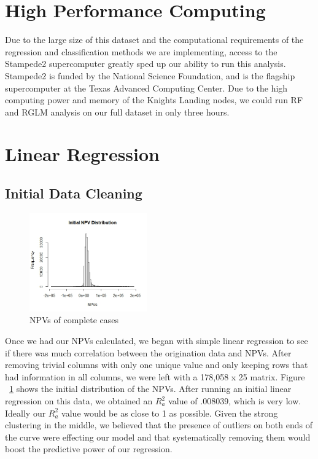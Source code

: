 \documentclass[12 pt]{uncw_thesis}
\theoremstyle{plain}
\theoremstyle{remark}
\theoremstyle{definition}
\begin{document}
\section{High Performance Computing}
Due to the large size of this dataset and the computational requirements of the regression and classification methods we are implementing, access to the Stampede2 supercomputer greatly sped up our ability to run this analysis. Stampede2 is funded by the National Science Foundation, and is the flagship supercomputer at the Texas Advanced Computing Center. Due to the high computing power and memory of the Knights Landing nodes, we could run RF and RGLM analysis on our full dataset in only three hours.  
\section{Linear Regression}
\subsection{Initial Data Cleaning}
\begin{figure}
	\vspace{-2cm}
	\centering
	\includegraphics[width=0.45\textwidth]{images/InitalNPVs.jpeg}
	\caption{NPVs of complete cases}
	\label{fig:InitialNPVs}
\end{figure}
Once we had our NPVs calculated, we began with simple linear regression to see if there was much correlation between the origination data and NPVs. After removing trivial columns with only  one unique value and only keeping rows that had information in all columns, we were left with a 178,058 x 25 matrix. Figure ~\ref{fig:InitialNPVs} shows the initial distribution of the NPVs.  After running an initial linear regression on this data, we obtained an \(R_a^2\) value of .008039, which is very low. Ideally our \(R_a^2\) value would be as close to 1 as possible. Given the strong clustering in the middle, we believed that the presence of outliers on both ends of the curve were effecting our model and that systematically removing them would boost the predictive power of our regression. 
\end{document}
